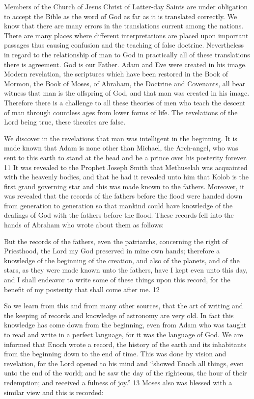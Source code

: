 Members of the Church of Jesus Christ of Latter-day Saints are under obligation to accept the
Bible as the word of God as far as it is translated correctly. We know that there are many
errors in the translations current among the nations. There are many places where different
interpretations are placed upon important passages thus causing confusion and the teaching
of false doctrine. Nevertheless in regard to the relationship of man to God in practically all of
these translations there is agreement. God is our Father. Adam and Eve were created in his
image. Modern revelation, the scriptures which have been restored in the Book of Mormon,
the Book of Moses, of Abraham, the Doctrine and Covenants, all bear witness that man is the
offspring of God, and that man was created in his image. Therefore there is a challenge to all
these theories of men who teach the descent of man through countless ages from lower forms
of life. The revelations of the Lord being true, these theories are false.

We discover in the revelations that man was intelligent in the beginning. It is made known
that Adam is none other than Michael, the Arch-angel, who was sent to this earth to stand at
the head and be a prince over his posterity forever. 11 It was revealed to the Prophet Joseph
Smith that Methuselah was acquainted with the heavenly bodies, and that he had it revealed
unto him that Kolob is the first grand governing star and this was made known to the fathers.
Moreover, it was revealed that the records of the fathers before the flood were handed down
from generation to generation so that mankind could have knowledge of the dealings of God
with the fathers before the flood. These records fell into the hands of Abraham who wrote
about them as follows:

But the records of the fathers, even the patriarchs, concerning the right of Priesthood, the
Lord my God preserved in mine own hands; therefore a knowledge of the beginning of the
creation, and also of the planets, and of the stars, as they were made known unto the fathers,
have I kept even unto this day, and I shall endeavor to write some of these things upon this
record, for the benefit of my posterity that shall come after me. 12

So we learn from this and from many other sources, that the art of writing and the keeping of
records and knowledge of astronomy are very old. In fact this knowledge has come down
from the beginning, even from Adam who was taught to read and write in a perfect language,
for it was the language of God. We are informed that Enoch wrote a record, the history of the
earth and its inhabitants from the beginning down to the end of time. This was done by vision
and revelation, for the Lord opened to his mind and ``showed Enoch all things, even unto the
end of the world; and he saw the day of the righteous, the hour of their redemption; and
received a fulness of joy.'' 13 Moses also was blessed with a similar view and this is
recorded:

